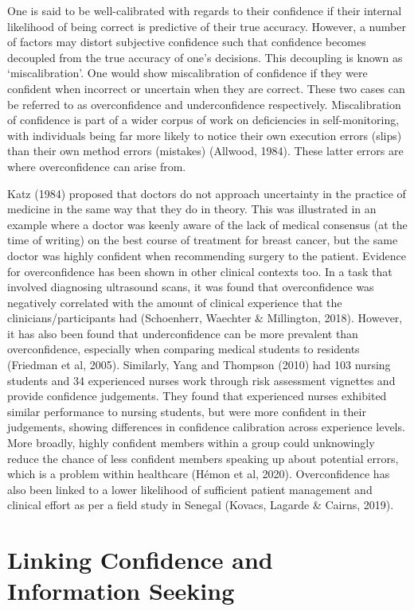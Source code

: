 \documentclass[a4paper, nobind]{templates/ociamthesis}
\begin{document}
One is said to be well-calibrated with regards to their confidence if their internal likelihood of being correct is predictive of their true accuracy. However, a number of factors may distort subjective confidence such that confidence becomes decoupled from the true accuracy of one's decisions. This decoupling is known as `miscalibration'. One would show miscalibration of confidence if they were confident when incorrect or uncertain when they are correct. These two cases can be referred to as overconfidence and underconfidence respectively. Miscalibration of confidence is part of a wider corpus of work on deficiencies in self-monitoring, with individuals being far more likely to notice their own execution errors (slips) than their own method errors (mistakes) (Allwood, 1984). These latter errors are where overconfidence can arise from.

Katz (1984) proposed that doctors do not approach uncertainty in the practice of medicine in the same way that they do in theory. This was illustrated in an example where a doctor was keenly aware of the lack of medical consensus (at the time of writing) on the best course of treatment for breast cancer, but the same doctor was highly confident when recommending surgery to the patient. Evidence for overconfidence has been shown in other clinical contexts too. In a task that involved diagnosing ultrasound scans, it was found that overconfidence was negatively correlated with the amount of clinical experience that the clinicians/participants had (Schoenherr, Waechter \& Millington, 2018). However, it has also been found that underconfidence can be more prevalent than overconfidence, especially when comparing medical students to residents (Friedman et al, 2005). Similarly, Yang and Thompson (2010) had 103 nursing students and 34 experienced nurses work through risk assessment vignettes and provide confidence judgements. They found that experienced nurses exhibited similar performance to nursing students, but were more confident in their judgements, showing differences in confidence calibration across experience levels. More broadly, highly confident members within a group could unknowingly reduce the chance of less confident members speaking up about potential errors, which is a problem within healthcare (Hémon et al, 2020). Overconfidence has also been linked to a lower likelihood of sufficient patient management and clinical effort as per a field study in Senegal (Kovacs, Lagarde \& Cairns, 2019).

\hypertarget{linking-confidence-and-information-seeking}{%
\section*{Linking Confidence and Information Seeking}\label{linking-confidence-and-information-seeking}}
\end{document}
